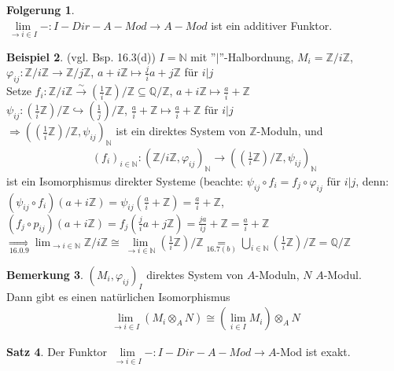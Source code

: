 \documentclass[10pt,a4paper,numbers=endperiod]{scrreprt}
\theoremstyle{definition}
\newtheorem{satz}{Satz}[section]
\newtheorem{bem}[satz]{Bemerkung}
\newtheorem{bsp}[satz]{Beispiel}
\newtheorem{folg}[satz]{Folgerung}
\def\QQ{{\mathbb Q}}
\def\NN{{\mathbb N}}
\def\ZZ{{\mathbb Z}}
\begin{document}
\begin{folg}
	$ $\\
	$\lim\limits_{\to i \in I} - : I-Dir-A-Mod \longrightarrow A-Mod$ ist ein additiver Funktor.
\end{folg}



\begin{bsp}
	(vgl. Bsp. 16.3(d)) $I = \NN$ mit ''$|$''-Halbordnung, $M_i = \ZZ/i\ZZ$,\\
	$\varphi_{ij}: \ZZ/i\ZZ \to \ZZ/j\ZZ$, $a + i\ZZ \mapsto \frac{j}{i} a + j\ZZ$ für $i|j$\\
	Setze $f_i: \ZZ/i\ZZ \overset{\sim}{\to} (\frac{1}{i}\ZZ)/\ZZ \subseteq \QQ/\ZZ$, $a + i\ZZ \mapsto \frac{a}{i} + \ZZ$\\
	$\psi_{ij}: (\frac{1}{i}\ZZ)/\ZZ \hookrightarrow (\frac{1}{j})/\ZZ$, $\frac{a}{i} + \ZZ \mapsto \frac{a}{i} + \ZZ$ für $i|j$\\
	$\Rightarrow ((\frac{1}{i}\ZZ)/\ZZ, \psi_{ij})_\NN$ ist ein direktes System von $\ZZ$-Moduln, und \begin{align*}
		(f_i)_{i \in \NN}: (\ZZ/i\ZZ, \varphi_{ij})_\NN \to ((\frac{1}{i} \ZZ)/\ZZ, \psi_{ij})_\NN
	\end{align*}
	ist ein Isomorphismus direkter Systeme (beachte: $\psi_{ij} \circ f_i = f_j \circ \varphi_{ij}$ für $i|j$, denn:\\
	$(\psi_{ij} \circ f_i)(a + i \ZZ) = \psi_{ij}(\frac{a}{i} + \ZZ) = \frac{a}{i} + \ZZ$,\\
	$(f_j \circ p_{ij})(a + i\ZZ) = f_j(\frac{j}{i}a + j \ZZ) = \frac{ja}{ij} + \ZZ = \frac{a}{i} + \ZZ$\\
	$\underset{16.0.9}{\Rightarrow} \lim_{\to i \in \NN} \ZZ/i\ZZ \cong \lim\limits_{\to i \in \NN} (\frac{1}{i} \ZZ)/\ZZ \underset{16.7(b)}{=} \bigcup\limits_{i \in \NN} (\frac{1}{i} \ZZ)/\ZZ = \QQ/\ZZ$
\end{bsp}

\begin{bem}
	$(M_i, \varphi_{ij})_I$ direktes System von $A$-Moduln, $N$ $A$-Modul.\\
	Dann gibt es einen natürlichen Isomorphismus \begin{align*}
		\lim\limits_{\to i \in I} (M_i \otimes_A N) \cong (\lim\limits_{i \in I} M_i) \otimes_A N
	\end{align*}
\end{bem}

\begin{satz}
	Der Funktor $\lim\limits_{\to i \in I} -: I-Dir-A-Mod \to A$-Mod ist exakt.
\end{satz}
\end{document}
